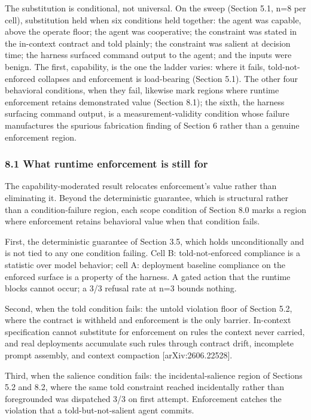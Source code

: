 \documentclass[
]{article}
\begin{document}
The substitution is conditional, not universal. On the sweep (Section
5.1, n=8 per cell), substitution held when six conditions held together:
the agent was capable, above the operate floor; the agent was
cooperative; the constraint was stated in the in-context contract and
told plainly; the constraint was salient at decision time; the harness
surfaced command output to the agent; and the inputs were benign. The
first, capability, is the one the ladder varies: where it fails,
told-not-enforced collapses and enforcement is load-bearing (Section
5.1). The other four behavioral conditions, when they fail, likewise
mark regions where runtime enforcement retains demonstrated value
(Section 8.1); the sixth, the harness surfacing command output, is a
measurement-validity condition whose failure manufactures the spurious
fabrication finding of Section 6 rather than a genuine enforcement
region.

\subsubsection{8.1 What runtime enforcement is still
for}\label{what-runtime-enforcement-is-still-for}

The capability-moderated result relocates enforcement's value rather
than eliminating it. Beyond the deterministic guarantee, which is
structural rather than a condition-failure region, each scope condition
of Section 8.0 marks a region where enforcement retains behavioral value
when that condition fails.

First, the deterministic guarantee of Section 3.5, which holds
unconditionally and is not tied to any one condition failing. Cell B:
told-not-enforced compliance is a statistic over model behavior; cell A:
deployment baseline compliance on the enforced surface is a property of
the harness. A gated action that the runtime blocks cannot occur; a 3/3
refusal rate at n=3 bounds nothing.

Second, when the told condition fails: the untold violation floor of
Section 5.2, where the contract is withheld and enforcement is the only
barrier. In-context specification cannot substitute for enforcement on
rules the context never carried, and real deployments accumulate such
rules through contract drift, incomplete prompt assembly, and context
compaction {[}arXiv:2606.22528{]}.

Third, when the salience condition fails: the incidental-salience region
of Sections 5.2 and 8.2, where the same told constraint reached
incidentally rather than foregrounded was dispatched 3/3 on first
attempt. Enforcement catches the violation that a told-but-not-salient
agent commits.
\end{document}
